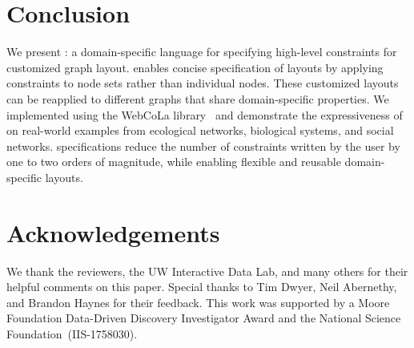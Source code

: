 \vspace{-7px}
\section{Conclusion}
We present \projectname: a domain-specific language for specifying high-level
constraints for customized graph layout. \projectname enables concise 
specification of layouts by applying constraints to node sets
rather than individual nodes. These customized layouts can
be reapplied to different graphs that share domain-specific properties.
We implemented \projectname using the WebCoLa library~\cite{WebCoLa} and demonstrate the expressiveness
of \projectname on real-world examples from ecological networks,
biological systems, and social networks. \projectname specifications reduce the
number of constraints written by the user by one to two orders of magnitude,
while enabling flexible and reusable domain-specific layouts.

\section*{Acknowledgements}
We thank the reviewers, the UW Interactive Data Lab, and
many others for their helpful comments on this paper. Special thanks to Tim Dwyer,
Neil Abernethy, and Brandon Haynes for their feedback. This work was supported
by a Moore Foundation Data-Driven Discovery Investigator Award
and the National Science \mbox{Foundation (IIS-1758030)}.